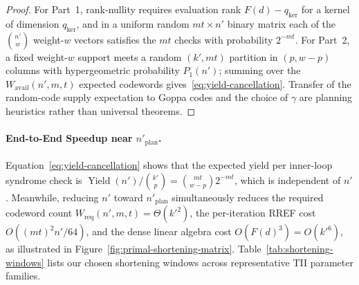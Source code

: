 \documentclass[11pt,a4paper]{article}
\theoremstyle{definition}
\theoremstyle{remark}
\begin{document}
\begin{proof}
For Part~1, rank-nullity requires evaluation rank $F(d) - q_{\ker}$ for a kernel of dimension $q_{\ker}$, and in a uniform random $mt \times n'$ binary matrix each of the $\binom{n'}{w}$ weight-$w$ vectors satisfies the $mt$ checks with probability $2^{-mt}$. For Part~2, a fixed weight-$w$ support meets a random $(k', mt)$ partition in $(p, w-p)$ columns with hypergeometric probability $P_1(n')$; summing over the $W_{\text{avail}}(n', m, t)$ expected codewords gives~\eqref{eq:yield-cancellation}. Transfer of the random-code supply expectation to Goppa codes and the choice of $\gamma$ are planning heuristics rather than universal theorems.
\end{proof}

\paragraph{End-to-End Speedup near $n'_{\mathrm{plan}}$.}
Equation~\eqref{eq:yield-cancellation} shows that the expected yield per inner-loop syndrome check is $\operatorname{Yield}(n') / \binom{k'}{p} = \binom{mt}{w-p} 2^{-mt}$, which is independent of $n'$. Meanwhile, reducing $n'$ toward $n'_{\mathrm{plan}}$ simultaneously reduces the required codeword count $W_{\text{req}}(n', m, t) = \Theta(k'^2)$, the per-iteration RREF cost $O((mt)^2 n' / 64)$, and the dense linear algebra cost $O(F(d)^3) = O(k'^6)$, as illustrated in Figure~\ref{fig:primal-shortening-matrix}. Table~\ref{tab:shortening-windows} lists our chosen shortening windows across representative TII parameter families.
\end{document}
